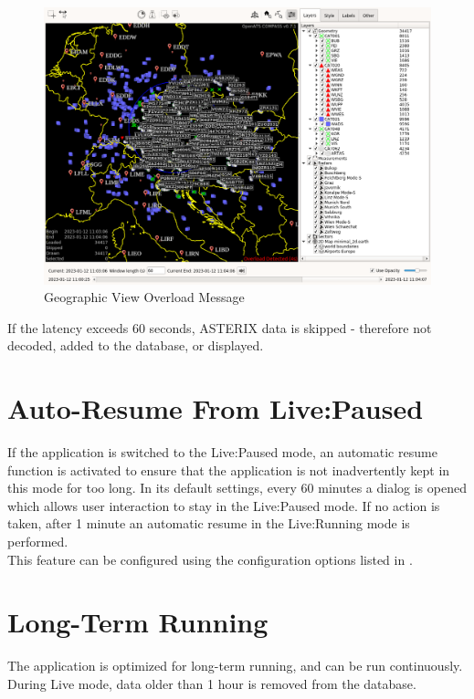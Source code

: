 \begin{figure}[H]
    \hspace*{-2.5cm}
    \includegraphics[width=19cm,frame]{figures/geoview_overload.png}
  \caption{Geographic View Overload Message}
\end{figure} 

If the latency exceeds 60 seconds, ASTERIX data is skipped - therefore not decoded, added to the database, or displayed.

\section{Auto-Resume From Live:Paused}

If the application is switched to the Live:Paused mode, an automatic resume function is activated to ensure that the application is not inadvertently kept in this mode for too long. In its default settings, every 60 minutes a dialog is opened which allows user interaction to stay in the Live:Paused mode. If no action is taken, after 1 minute an automatic resume in the Live:Running mode is performed. \\

This feature can be configured using the configuration options listed in .

\section{Long-Term Running}

The application is optimized for long-term running, and can be run continuously. During Live mode, data older than 1 hour is removed from the database. \\

